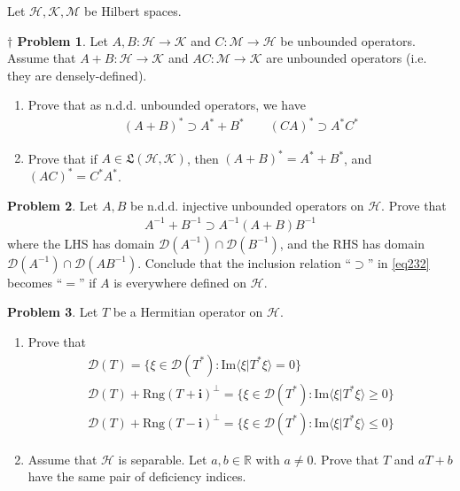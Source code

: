\documentclass[12pt,b5paper,notitlepage]{article}
\theoremstyle{definition}
\newtheorem{prob}{\color{red}Problem}[section]
\newtheorem{dprob}[prob]{\color{red}$\dagger$ Problem}
\theoremstyle{plain}
\newcommand{\fk}{\mathfrak}
\newcommand{\Dom}{\mathscr{D}}
\newcommand{\bk}[1]{\langle {#1}\rangle}
\newcommand{\im}{\mathbf{i}}
\newcommand{\Rbb}{\mathbb R}
\newcommand{\Rng}{\mathrm{Rng}}
\newcommand{\Imag}{\mathrm{Im}}
\newcommand{\MH}{\mathcal H}
\newcommand{\MK}{\mathcal K}
\newcommand{\MM}{\mathcal M}
\numberwithin{equation}{section}
\begin{document}
Let $\MH,\MK,\MM$ be Hilbert spaces.


\begin{dprob}\label{lb405}
Let $A,B:\MH\rightarrow\MK$ and $C:\MM\rightarrow\MH$ be unbounded operators. Assume that $A+B:\MH\rightarrow\MK$ and $AC:\MM\rightarrow\MK$ are unbounded operators (i.e. they are densely-defined). 
\begin{enumerate}
\item Prove that as n.d.d. unbounded operators, we have
\begin{align*}
(A+B)^*\supset A^*+B^*\qquad (CA)^*\supset A^*C^*
\end{align*}
\item Prove that if $A\in\fk L(\MH,\MK)$, then $(A+B)^*=A^*+B^*$, and $(AC)^*=C^*A^*$. 
\end{enumerate}
\end{dprob}


\begin{prob}\label{lb449}
Let $A,B$ be n.d.d. injective unbounded operators on $\MH$. Prove that
\begin{align}\label{eq232}
A^{-1}+B^{-1}\supset A^{-1}(A+B)B^{-1}
\end{align}
where the LHS has domain $\Dom(A^{-1})\cap\Dom(B^{-1})$, and the RHS has domain $\Dom(A^{-1})\cap\Dom(AB^{-1})$. Conclude that the inclusion relation ``$\supset$'' in \eqref{eq232} becomes ``$=$'' if $A$ is everywhere defined on $\MH$.
\end{prob}

\begin{prob}
Let $T$ be a Hermitian operator on $\MH$.
\begin{enumerate}
\item Prove that
\begin{gather*}
\Dom(T)=\{\xi\in\Dom(T^*):\Imag\bk{\xi|T^*\xi}=0\}\\
\Dom(T)+\Rng(T+\im)^\perp=\{\xi\in\Dom(T^*):\Imag\bk{\xi|T^*\xi}\geq0\}\\
\Dom(T)+\Rng(T-\im)^\perp=\{\xi\in\Dom(T^*):\Imag\bk{\xi|T^*\xi}\leq0\}
\end{gather*}
\item Assume that $\MH$ is separable. Let $a,b\in\Rbb$ with $a\neq0$. Prove that $T$ and $aT+b$ have the same pair of deficiency indices.
\end{enumerate}
\end{prob}
\end{document}
